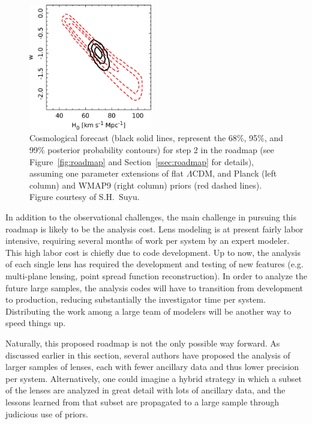 \begin{figure}
\begin{center}
\includegraphics[height=5.5cm,clip]{figures/wmap9_wcdm_c22lenses_stats.jpg}
\end{center}
\caption{Cosmological forecast (black solid lines, represent the 68\%,
95\%, and 99\% posterior probability contours) for step 2 in the roadmap
(see Figure~\ref{fig:roadmap} and Section~\ref{ssec:roadmap} for
details), assuming one parameter extensions of flat $\Lambda$CDM, and
Planck (left column) and WMAP9 (right column) priors (red dashed lines).
Figure courtesy of S.H.~Suyu.}
\label{fig:roadmap-step2}
\end{figure}

In addition to the observational challenges, the main challenge in
pursuing this roadmap is likely to be the analysis cost. Lens modeling
is at present fairly labor intensive, requiring several months of work
per system by an expert modeler. This high labor cost is chiefly due to
code development. Up to now, the analysis of each single lens has
required the development and testing of new features (e.g. multi-plane
lensing, point spread function reconstruction). In order to analyze
the future large samples, the analysis codes will have to transition
from development to production, reducing substantially the
investigator time per system. Distributing the work among a large team
of modelers will be another way to speed things up.

Naturally, this proposed roadmap is not the only possible way
forward. As discussed earlier in this section, several authors have
proposed the analysis of larger samples of lenses, each with fewer
ancillary data and thus lower precision per system. Alternatively, one
could imagine a hybrid strategy in which a subset of the lenses are
analyzed in great detail with lots of ancillary data, and the lessons
learned from that subset are propagated to a large sample through
judicious use of priors.
